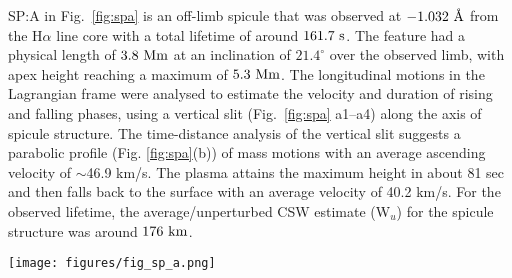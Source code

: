 \documentclass[12pt]{ociamthesis}
\newcommand{\degs}{^{\circ}}
\newcommand{\angstrom}{\textup{\AA}}
\begin{document}
%
SP:A in Fig.~\ref{fig:spa} is an off-limb spicule that was observed at $-1.032~\angstrom$ from the H$\alpha$ line core with a total lifetime of around $161.7~\rm{s}$. The feature had a physical length of $3.8~\rm{Mm}$ at an inclination of $21.4\degs$ over the observed limb, with apex height reaching a maximum of $5.3~\rm{Mm}$. The longitudinal motions in the Lagrangian frame were analysed to estimate the velocity and duration of rising and falling phases, using a vertical slit (Fig.~\ref{fig:spa} a1–a4) along the axis of spicule structure. The time-distance analysis of the vertical slit suggests a parabolic profile (Fig. \ref{fig:spa}(b)) of mass motions with an average ascending velocity of $\sim$46.9 km/s. The plasma attains the maximum height in about 81 sec and then falls back to the surface with an average velocity of 40.2 km/s. For the observed lifetime, the average/unperturbed CSW estimate (W$_{u}$) for the spicule structure was around $176~\rm{km}$.
\begin{figure*}
\texttt{[image: figures/fig\_sp\_a.png]}
\caption{Panels (a1) – (a4) show the temporal evolution of candidate spicule feature (SP:A) in the H$\alpha$ passband at four instances, with positions of vertical (cyan) and horizontal (yellow) slits used for the estimation of field-aligned mass flows and CSW respectively. Panel (b) shows the time-distance plot from the vertical slit on the spicule, highlighting the rise- and fall-phases of field-aligned mass flow. The maximum height attained by the visible plasma is marked with the ‘+’ symbol, along with estimated velocities (46.9 km/s, 40.25 km/s). Bottom panel (c) shows an example of Gaussian fit for intensity magnitudes for horizontal slit location (marked as a yellow line on (a1) – (a4)), with error bars, denoting the standard deviation for intensity values. The vertical black line marks the position of the amplitude of Gaussian fit, while shaded-regions mark average/unperturbed width (W$_{u}$) during spicule lifetime and perturbed/instantaneous width (W). This figure is taken from \cite{Dover2020ApJ90572D} and was produced by Dr. Sharma.}
\label{fig:spa} 
\end{figure*}
\end{document}
